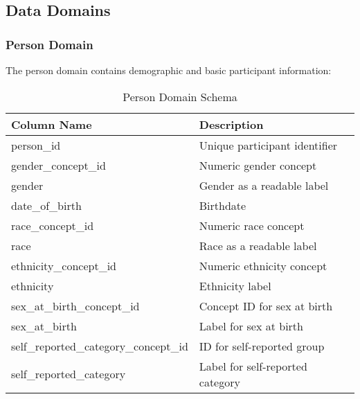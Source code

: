 \documentclass[12pt]{article}
\begin{document}
\subsection{Data Domains}

\subsubsection{Person Domain}
The person domain contains demographic and basic participant information:
\begin{table}[h]
\centering
\begin{tabular}{|l|l|}
\hline
\textbf{Column Name} & \textbf{Description} \\
\hline
person\_id & Unique participant identifier \\
gender\_concept\_id & Numeric gender concept \\
gender & Gender as a readable label \\
date\_of\_birth & Birthdate \\
race\_concept\_id & Numeric race concept \\
race & Race as a readable label \\
ethnicity\_concept\_id & Numeric ethnicity concept \\
ethnicity & Ethnicity label \\
sex\_at\_birth\_concept\_id & Concept ID for sex at birth \\
sex\_at\_birth & Label for sex at birth \\
self\_reported\_category\_concept\_id & ID for self-reported group \\
self\_reported\_category & Label for self-reported category \\
\hline
\end{tabular}
\caption{Person Domain Schema}
\end{table}
\end{document}
